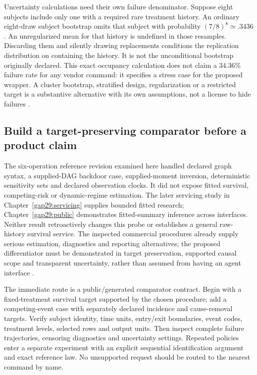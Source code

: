 Uncertainty calculations need their own failure denominator. Suppose eight
subjects include only one with a required rare treatment history. An ordinary
eight-draw subject bootstrap omits that subject with probability
$(7/8)^8\simeq.3436$. An unregularized mean for that history is undefined in
those resamples. Discarding them and silently drawing replacements conditions
the replication distribution on containing the history. It is not the
unconditional bootstrap originally declared. This exact occupancy calculation
does not claim a 34.36\% failure rate for any vendor command: it specifies a
stress case for the proposed wrapper. A cluster bootstrap, stratified design,
regularization or a restricted target is a substantive alternative with its
own assumptions, not a license to hide failures \citep{exec14_survival_exact}.

\subsection{Build a target-preserving comparator before a product claim}

The six-operation reference revision examined here handled declared graph
syntax, a supplied-DAG backdoor case, supplied-moment inversion, deterministic
sensitivity sets and declared observation clocks. It did not expose fitted
survival, competing-risk or dynamic-regime estimation. The later servicing
study in Chapter~\ref{gap29:servicing} supplies bounded fitted research;
Chapter~\ref{gap29:public} demonstrates fitted-summary inference across
interfaces. Neither result retroactively changes this probe or establishes a
general raw-history survival service. The inspected
commercial procedures already supply serious estimation, diagnostics and
reporting alternatives; the proposed differentiator must be demonstrated in
target preservation, supported causal scope and transparent uncertainty,
rather than assumed from having an agent interface
\citep{exec14_survival_survey}.

The immediate route is a public/generated comparator contract. Begin with a
fixed-treatment survival target supported by the chosen procedure; add a
competing-event case with separately declared incidence and cause-removal
targets. Verify subject identity, time units, entry/exit boundaries, event
codes, treatment levels, selected rows and output units. Then inspect complete
failure trajectories, censoring diagnostics and uncertainty settings. Repeated
policies enter a separate experiment with an explicit sequential identification
argument and exact reference law. No unsupported request should be routed to
the nearest command by name.

